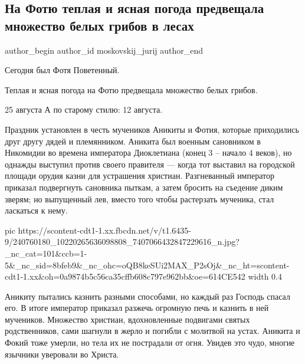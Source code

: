  
 
 
 
 
 
\subsection{На Фотю теплая и ясная погода предвещала множество белых грибов в лесах}
\label{sec:25_08_2021.fb.moskovskij_jurij.1.belyje_gribu_fotja}
 
\ifcmt
 author_begin
   author_id moskovskij_jurij
 author_end
\fi

Сегодня был Фотя Поветенный.

Теплая и ясная погода на Фотю предвещала множество белых грибов.

25 августа А по старому стилю: 12 августа.

Праздник установлен в честь мучеников Аникиты и Фотия, которые приходились друг
другу дядей и племянником. Аникита был военным сановником в Никомидии во
времена императора Диоклетиана (конец 3 – начало 4 веков), но однажды выступил
против своего правителя — когда тот выставил на городской площади орудия казни
для устрашения христиан. Разгневанный император приказал подвергнуть сановника
пыткам, а затем бросить на съедение диким зверям; но выпущенный лев, вместо
того чтобы растерзать мученика, стал ласкаться к нему.

\ifcmt
  pic https://scontent-cdt1-1.xx.fbcdn.net/v/t1.6435-9/240760180_10220265636098808_7407066432847229616_n.jpg?_nc_cat=101&ccb=1-5&_nc_sid=8bfeb9&_nc_ohc=oQB8keSUi2MAX_P2sOj&_nc_ht=scontent-cdt1-1.xx&oh=0a9874b5c56ca35cffb608c797e962bb&oe=614CE542
  width 0.4
\fi

Аникиту пытались казнить разными способами, но каждый раз Господь спасал его. В
итоге император приказал разжечь огромную печь и казнить в ней мучеников.
Множество христиан, вдохновленные подвигами святых родственников, сами шагнули
в жерло и погибли с молитвой на устах. Аникита и Фокий тоже умерли, но тела их
не пострадали от огня. Увидев это чудо, многие язычники уверовали во Христа.

